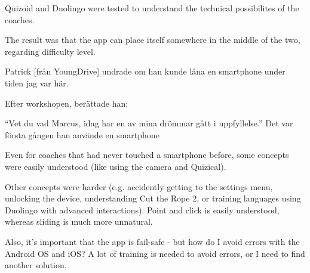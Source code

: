     Quizoid and Duolingo were tested to understand the technical possibilites of the coaches.

    The result was that the app can place itself somewhere in the middle of the two, regarding difficulty level.

    Patrick [från YoungDrive] undrade om han kunde låna en smartphone under tiden jag var här.

    Efter workshopen, berättade han:

    “Vet du vad Marcus, idag har en av mina drömmar gått i uppfyllelse.”
    Det var första gången han använde en smartphone

    Even for coaches that had never touched a smartphone before, some concepts were easily understood (like using the camera and Quizical).

    Other concepts were harder (e.g. accidently getting to the settings menu, unlocking the device, understanding Cut the Rope 2, or training languages using Duolingo with advanced interactions). Point and click is easily understood, whereas sliding is much more unnatural.

    Also, it’s important that the app is fail-safe - but how do I avoid errors with the Android OS and iOS? A lot of training is needed to avoid errors, or I need to find another solution.
